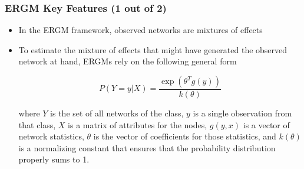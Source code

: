 \documentclass[show notes, aspectratio=1610]{beamer}
\begin{document}
\begin{frame}
  \frametitle{ERGM Key Features (1 out of 2)}
  \begin{itemize}
    \item In the ERGM framework, observed networks are mixtures of effects
    \item To estimate the mixture of effects that might have generated the 
      observed network at hand, ERGMs rely on the following general form

      \begin{equation}
        \label{eq:ergm_gen_form}
        P(Y = y | X) = \frac{\exp(\theta^T g(y))}{k(\theta)}
      \end{equation}

      where $Y$ is the set of all networks of the class, $y$ is a single observation
      from that class, $X$ is a matrix of attributes for the nodes, $g(y,x)$ is a
      vector of network statistics, $\theta$ is the vector of coefficients for those
      statistics, and $k(\theta)$ is a normalizing constant that ensures that the
      probability distribution properly sums to 1.
  \end{itemize}
\end{frame}
\end{document}
